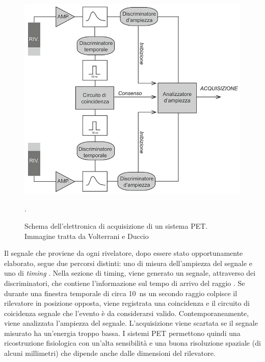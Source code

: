 \begin{figure}[tbh]
	\centering
	\includegraphics[width=0.6\linewidth]{./ImageFiles/circuito pet.jpg}
	\caption{Schema dell'elettronica di acquisizione di un sistema PET. Immagine tratta da Volterrani e Duccio \cite{Volterrani2010}}. 
	\label{fig:pet_circuit}
\end{figure} 
Il segnale che proviene da ogni rivelatore, dopo essere stato opportunamente elaborato, segue due percorsi distinti: uno di misura dell'ampiezza del segnale e uno di \textit{timing} \cite{Volterrani2010}. Nella sezione di timing, viene generato un segnale, attraverso dei discriminatori, che contiene l'informazione sul tempo di arrivo del raggio \textgamma. Se durante una finestra temporale di circa \SI{10}{\nano\second} un secondo raggio \textgamma colpisce il rilevatore in posizione opposta, viene registrata una coincidenza e il circuito di coicidenza segnale che l'evento è da considerarsi valido. Contemporaneamente, viene analizzata l'ampiezza del segnale. L'acquisizione viene scartata se il segnale misurato ha un'energia troppo bassa. I sistemi PET permettono quindi una ricostruzione fisiologica con un'alta sensibilità e una buona risoluzione spaziale (di alcuni millimetri) che dipende anche dalle dimensioni del rilevatore.

